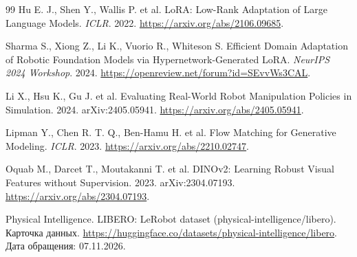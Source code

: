 \documentclass{misisarticle}
\begin{document}
\begin{thebibliography}{99}
Hu E. J., Shen Y., Wallis P. et al. LoRA: Low-Rank Adaptation of Large Language Models. \textit{ICLR}. 2022. \url{https://arxiv.org/abs/2106.09685}.

Sharma S., Xiong Z., Li K., Vuorio R., Whiteson S. Efficient Domain Adaptation of Robotic Foundation Models via Hypernetwork-Generated LoRA. \textit{NeurIPS 2024 Workshop}. 2024. \url{https://openreview.net/forum?id=SEvvWs3CAL}.

Li X., Hsu K., Gu J. et al. Evaluating Real-World Robot Manipulation Policies in Simulation. 2024. arXiv:2405.05941. \url{https://arxiv.org/abs/2405.05941}.

Lipman Y., Chen R. T. Q., Ben-Hamu H. et al. Flow Matching for Generative Modeling. \textit{ICLR}. 2023. \url{https://arxiv.org/abs/2210.02747}.

Oquab M., Darcet T., Moutakanni T. et al. DINOv2: Learning Robust Visual Features without Supervision. 2023. arXiv:2304.07193. \url{https://arxiv.org/abs/2304.07193}.

Physical Intelligence. LIBERO: LeRobot dataset (physical-intelligence/libero). Карточка данных. \url{https://huggingface.co/datasets/physical-intelligence/libero}. Дата обращения: 07.11.2026.

\end{thebibliography}
\end{document}
